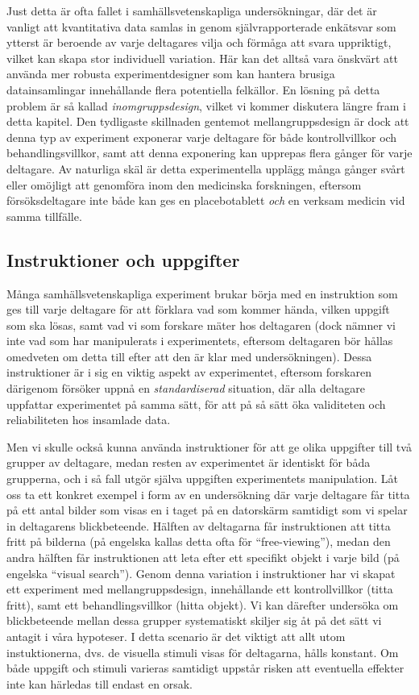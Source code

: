\documentclass[
]{book}
\begin{document}
Just detta är ofta fallet i samhällsvetenskapliga undersökningar, där det är vanligt att kvantitativa data samlas in genom självrapporterade enkätsvar som ytterst är beroende av varje deltagares vilja och förmåga att svara uppriktigt, vilket kan skapa stor individuell variation. Här kan det alltså vara önskvärt att använda mer robusta experimentdesigner som kan hantera brusiga datainsamlingar innehållande flera potentiella felkällor. En lösning på detta problem är så kallad \emph{inomgruppsdesign}, vilket vi kommer diskutera längre fram i detta kapitel. Den tydligaste skillnaden gentemot mellangruppsdesign är dock att denna typ av experiment exponerar varje deltagare för både kontrollvillkor och behandlingsvillkor, samt att denna exponering kan upprepas flera gånger för varje deltagare. Av naturliga skäl är detta experimentella upplägg många gånger svårt eller omöjligt att genomföra inom den medicinska forskningen, eftersom försöksdeltagare inte både kan ges en placebotablett \emph{och} en verksam medicin vid samma tillfälle.

\hypertarget{sub07.5.1}{%
\subsection{Instruktioner och uppgifter}\label{sub07.5.1}}

Många samhällsvetenskapliga experiment brukar börja med en instruktion som ges till varje deltagare för att förklara vad som kommer hända, vilken uppgift som ska lösas, samt vad vi som forskare mäter hos deltagaren (dock nämner vi inte vad som har manipulerats i experimentets, eftersom deltagaren bör hållas omedveten om detta till efter att den är klar med undersökningen). Dessa instruktioner är i sig en viktig aspekt av experimentet, eftersom forskaren därigenom försöker uppnå en \emph{standardiserad} situation, där alla deltagare uppfattar experimentet på samma sätt, för att på så sätt öka validiteten och reliabiliteten hos insamlade data.

Men vi skulle också kunna använda instruktioner för att ge olika uppgifter till två grupper av deltagare, medan resten av experimentet är identiskt för båda grupperna, och i så fall utgör själva uppgiften experimentets manipulation. Låt oss ta ett konkret exempel i form av en undersökning där varje deltagare får titta på ett antal bilder som visas en i taget på en datorskärm samtidigt som vi spelar in deltagarens blickbeteende. Hälften av deltagarna får instruktionen att titta fritt på bilderna (på engelska kallas detta ofta för ``free-viewing''), medan den andra hälften får instruktionen att leta efter ett specifikt objekt i varje bild (på engelska ``visual search''). Genom denna variation i instruktioner har vi skapat ett experiment med mellangruppsdesign, innehållande ett kontrollvillkor (titta fritt), samt ett behandlingsvillkor (hitta objekt). Vi kan därefter undersöka om blickbeteende mellan dessa grupper systematiskt skiljer sig åt på det sätt vi antagit i våra hypoteser. I detta scenario är det viktigt att allt utom instuktionerna, dvs. de visuella stimuli visas för deltagarna, hålls konstant. Om både uppgift och stimuli varieras samtidigt uppstår risken att eventuella effekter inte kan härledas till endast en orsak.
\end{document}
